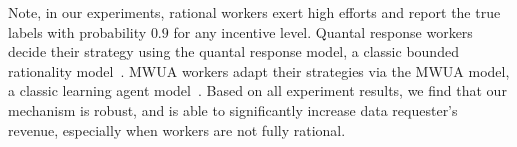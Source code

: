 \documentclass{article}
\begin{document}
Note, in our experiments, rational workers exert  high efforts and report the true labels with probability $0.9$ for any incentive level.
Quantal response workers decide their strategy using the quantal response model, a classic bounded rationality model~\cite{mckelvey1995quantal}.
MWUA workers adapt their strategies via the MWUA model, a classic learning agent model~\cite{chastain2014algorithms}.
Based on all experiment results, we find that our mechanism is robust, and is able to significantly increase data requester's revenue, especially when workers are not fully rational.



\newpage


\end{document}
